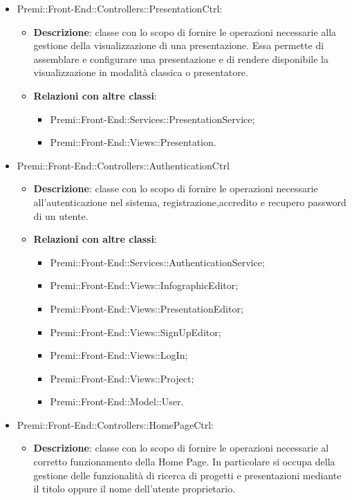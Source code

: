 \begin{itemize}
	\item  Premi::Front-End::Controllers::PresentationCtrl:
	\begin{itemize}
		\item \textbf{Descrizione}: classe con lo scopo di fornire le operazioni necessarie alla gestione della visualizzazione di una presentazione. Essa permette di assemblare e configurare una presentazione e di rendere disponibile la visualizzazione in modalità classica o presentatore.
		\item \textbf{Relazioni con altre classi}:
		\begin{itemize}
			\item Premi::Front-End::Services::PresentationService;
			\item Premi::Front-End::Views::Presentation.
		\end{itemize}
	\end{itemize}
	\item  Premi::Front-End::Controllers::AuthenticationCtrl
		\begin{itemize}
		\item \textbf{Descrizione}: classe con lo scopo di fornire le operazioni necessarie all'autenticazione nel sistema, registrazione,accredito e recupero password di un utente.
		\item \textbf{Relazioni con altre classi}:
		\begin{itemize}
			\item Premi::Front-End::Services::AuthenticationService;
			\item Premi::Front-End::Views::InfographicEditor;
			\item Premi::Front-End::Views::PresentationEditor;
			\item Premi::Front-End::Views::SignUpEditor;
			\item Premi::Front-End::Views::LogIn;
			\item Premi::Front-End::Views::Project;
			\item Premi::Front-End::Model::User.
		\end{itemize}
	\end{itemize}
	\item  Premi::Front-End::Controllers::HomePageCtrl:
	\begin{itemize}
		\item \textbf{Descrizione}: classe con lo scopo di fornire le operazioni necessarie al corretto funzionamento della Home Page. In particolare si occupa della gestione delle funzionalità di ricerca di progetti e presentazioni mediante il titolo oppure il nome dell'utente proprietario.

\end{itemize}
\end{itemize}
